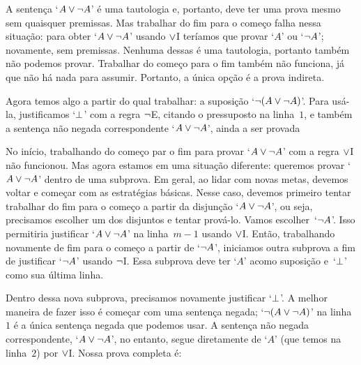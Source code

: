A senten\c ca `$A \vee \neg A$' \'e uma tautologia e, portanto, deve ter uma prova mesmo sem quaisquer premissas. Mas trabalhar do fim para o come\c co falha nessa situa\c c\~ao: para obter `$A \vee \neg A$' usando $\vee$I ter\'iamos que provar `$A$' ou `$\neg A$'; novamente, sem premissas. Nenhuma dessas \'e uma tautologia, portanto tamb\'em n\~ao podemos provar. Trabalhar  do come\c co para o fim tamb\'em n\~ao funciona, j\'a que n\~ao h\'a nada para assumir. Portanto, a \'unica op\c c\~ao \'e a prova indireta.
\begin{fitchproof}
	\open
	\ellipsesline
	\close
\end{fitchproof}
Agora temos algo a partir do qual trabalhar: a suposi\c c\~ao  `$\neg(A \vee \neg A)$'. Para us\'a-la, justificamos `$\bot$' com a regra $\neg$E, citando o pressuposto na linha~$1$, e tamb\'em a senten\c ca n\~ao negada correspondente `$A \vee \neg A$', ainda a ser provada
\begin{fitchproof}
	\open
	\ellipsesline
	\close
\end{fitchproof}


No in\'icio, trabalhando  do come\c co par o fim para provar `$A \vee\neg A$' com a regra $\vee$I n\~ao funcionou. Mas agora estamos em uma situa\c c\~ao diferente: queremos provar `$A \vee\neg A$' dentro de uma subprova. Em geral, ao lidar com novas metas, devemos voltar e come\c car com as estrat\'egias b\'asicas. Nesse caso, devemos primeiro tentar trabalhar do fim para o come\c co a partir da disjun\c c\~ao `$A \vee \neg A$', ou seja, precisamos escolher um dos disjuntos  e tentar prov\'a-lo. Vamos escolher~`$\neg A$'. Isso permitiria justificar `$A \vee \neg A$' na linha~$m - 1$ usando $\vee$I. Ent\~ao, trabalhando novamente de fim para o come\c co a partir de `$\neg A$', iniciamos outra subprova a fim de justificar  `$\neg A$' usando $\neg$I. Essa subprova deve ter `$A$' acomo suposi\c c\~ao e~`$\bot$' como sua \'ultima linha.
\begin{fitchproof}
	\open
	\open
	\ellipsesline
	\close
	\close
\end{fitchproof}
Dentro dessa nova subprova, precisamos novamente justificar `$\bot$'. A melhor maneira de fazer isso \'e come\c car com uma senten\c ca negada; `$\neg(A \vee \neg A)$' na linha~$1$ \'e a \'unica senten\c ca negada que podemos usar. A senten\c ca n\~ao negada correspondente,  `$A \vee \neg A$', no entanto, segue diretamente de `$A$' (que temos na linha~$2$) por $\vee$I. Nossa prova completa \'e:
\begin{fitchproof}
	\open
	\open
	\close
	\close
\end{fitchproof}


